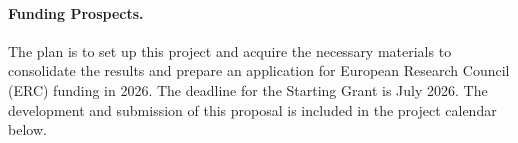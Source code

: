 \documentclass[11pt, a4paper]{article}
\begin{document}




\paragraph{Funding Prospects.}The plan is to set up this project and acquire 
the necessary materials to consolidate the results and prepare an application for 
European Research Council (ERC) funding in 2026. The deadline for the Starting Grant is July 2026.
The development and submission of this proposal is included in the project calendar below.
\end{document}
